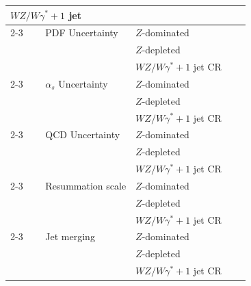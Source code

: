 \begin{table}[ht!]
{\begin{tabular}{llrl}
    \hline                                                                                             
    $WZ/W\gamma^{*}+1$ jet & & & \\
    \cline{2-3}
    ~~~~PDF Uncertainty                                                                                & $Z$-dominated   \\
                                                                                                       & $Z$-depleted    \\
                                                                                                       & $WZ/W\gamma^{*}+1$ jet CR\\
    \cline{2-3}                                                                                               
    ~~~~$\alpha_{s}$ Uncertainty                                                                       & $Z$-dominated   \\
                                                                                                       & $Z$-depleted   \\
                                                                                                       & $WZ/W\gamma^{*}+1$ jet{} CR  \\
    \cline{2-3}                                                                                               
    ~~~~QCD Uncertainty                                                                                & $Z$-dominated   \\
                                                                                                       & $Z$-depleted   \\
                                                                                                       & $WZ/W\gamma^{*}+1$ jet CR  \\
    \cline{2-3}
    ~~~~Resummation scale                                                                              & $Z$-dominated   \\
                                                                                                       & $Z$-depleted    \\
                                                                                                       & $WZ/W\gamma^{*}+1$ jet CR  \\
    \cline{2-3}
    ~~~~Jet merging                                                                                    & $Z$-dominated   \\
                                                                                                       & $Z$-depleted    \\
                                                                                                       & $WZ/W\gamma^{*}+1$ jet CR  \\


\end{tabular}}
\end{table}

